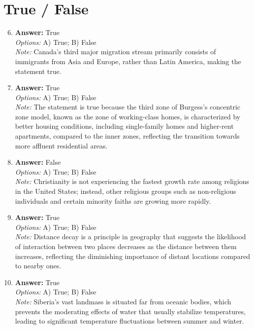 \documentclass[12pt]{article}
\begin{document}
\section*{True / False}
\begin{enumerate}[label=\arabic*.]
\setcounter{enumi}{5}
\item \textbf{Answer:} True
\\ \textit{Options:} A) True; B) False
\\ \textit{Note:} Canada's third major migration stream primarily consists of immigrants from Asia and Europe, rather than Latin America, making the statement true.
\item \textbf{Answer:} True
\\ \textit{Options:} A) True; B) False
\\ \textit{Note:} The statement is true because the third zone of Burgess's concentric zone model, known as the zone of working-class homes, is characterized by better housing conditions, including single-family homes and higher-rent apartments, compared to the inner zones, reflecting the transition towards more affluent residential areas.
\item \textbf{Answer:} False
\\ \textit{Options:} A) True; B) False
\\ \textit{Note:} Christianity is not experiencing the fastest growth rate among religions in the United States; instead, other religious groups such as non-religious individuals and certain minority faiths are growing more rapidly.
\item \textbf{Answer:} True
\\ \textit{Options:} A) True; B) False
\\ \textit{Note:} Distance decay is a principle in geography that suggests the likelihood of interaction between two places decreases as the distance between them increases, reflecting the diminishing importance of distant locations compared to nearby ones.
\item \textbf{Answer:} True
\\ \textit{Options:} A) True; B) False
\\ \textit{Note:} Siberia's vast landmass is situated far from oceanic bodies, which prevents the moderating effects of water that usually stabilize temperatures, leading to significant temperature fluctuations between summer and winter.
\end{enumerate}
\end{document}
